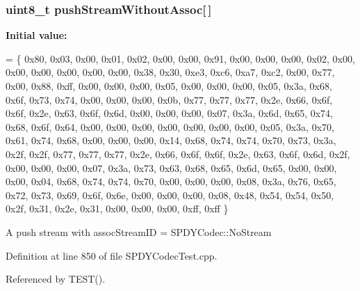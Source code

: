 \subsubsection[{push\+Stream\+Without\+Assoc}]{\setlength{\rightskip}{0pt plus 5cm}uint8\+\_\+t push\+Stream\+Without\+Assoc[$\,$]}\label{SPDYCodecTest_8cpp_a165531b605495d0351b390a535ee45ff}
{\bfseries Initial value\+:}
\begin{DoxyCode}
=
\{ 0x80, 0x03, 0x00, 0x01, 0x02, 0x00, 0x00, 0x91,
  0x00, 0x00, 0x00, 0x02, 0x00, 0x00, 0x00, 0x00,
  0x00, 0x00, 0x38, 0x30, 0xe3, 0xc6, 0xa7, 0xc2,
  0x00, 0x77, 0x00, 0x88, 0xff, 0x00, 0x00, 0x00,
  0x05, 0x00, 0x00, 0x00, 0x05, 0x3a, 0x68, 0x6f,
  0x73, 0x74, 0x00, 0x00, 0x00, 0x0b, 0x77, 0x77,
  0x77, 0x2e, 0x66, 0x6f, 0x6f, 0x2e, 0x63, 0x6f,
  0x6d, 0x00, 0x00, 0x00, 0x07, 0x3a, 0x6d, 0x65,
  0x74, 0x68, 0x6f, 0x64, 0x00, 0x00, 0x00, 0x00,
  0x00, 0x00, 0x00, 0x05, 0x3a, 0x70, 0x61, 0x74,
  0x68, 0x00, 0x00, 0x00, 0x14, 0x68, 0x74, 0x74,
  0x70, 0x73, 0x3a, 0x2f, 0x2f, 0x77, 0x77, 0x77,
  0x2e, 0x66, 0x6f, 0x6f, 0x2e, 0x63, 0x6f, 0x6d,
  0x2f, 0x00, 0x00, 0x00, 0x07, 0x3a, 0x73, 0x63,
  0x68, 0x65, 0x6d, 0x65, 0x00, 0x00, 0x00, 0x04,
  0x68, 0x74, 0x74, 0x70, 0x00, 0x00, 0x00, 0x08,
  0x3a, 0x76, 0x65, 0x72, 0x73, 0x69, 0x6f, 0x6e,
  0x00, 0x00, 0x00, 0x08, 0x48, 0x54, 0x54, 0x50,
  0x2f, 0x31, 0x2e, 0x31, 0x00, 0x00, 0x00, 0xff,
  0xff
\}
\end{DoxyCode}
A push stream with assoc\+Stream\+ID = S\+P\+D\+Y\+Codec\+::\+No\+Stream 

Definition at line 850 of file S\+P\+D\+Y\+Codec\+Test.\+cpp.



Referenced by T\+E\+S\+T().

